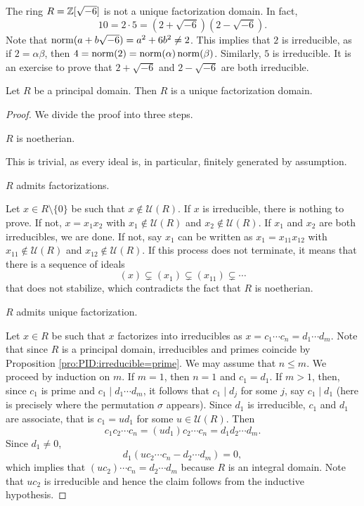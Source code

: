 \begin{example}
	The ring $R=\mathbb{Z}[\sqrt{-6}]$ is not a unique factorization domain. In fact,
	\[
	10=2\cdot 5=(2+\sqrt{-6})(2-\sqrt{-6}).
	\]	
	Note that $\operatorname{norm}(a+b\sqrt{-6})=a^2+6b^2\ne 2$. This implies that $2$ is irreducible, as 
	if $2=\alpha\beta$, then $4=\operatorname{norm}(2)=\operatorname{norm}(\alpha)\operatorname{norm}(\beta)$. 
	Similarly, $5$ is irreducible. It is an exercise to prove that 
	$2+\sqrt{-6}$ and $2-\sqrt{-6}$ are both irreducible. 
\end{example}

\begin{theorem}
\label{thm:PID=>UFD}
	Let $R$ be a principal domain. 
	Then $R$ is a unique factorization domain.
\end{theorem}

\begin{proof}
	We divide the proof into three steps. 
	\begin{claim}
		$R$ is noetherian. 	
	\end{claim}
	
	This is trivial, as every ideal is, in particular, finitely generated by assumption.   

	\begin{claim}
		$R$ admits factorizations. 	
	\end{claim}
	
	Let $x\in R\setminus\{0\}$ be such that $x\not\in\mathcal{U}(R)$. If $x$ is irreducible, 
	there is nothing to prove. If not, $x=x_1x_2$ with $x_1\not\in\mathcal{U}(R)$ and
	$x_2\not\in\mathcal{U}(R)$. If $x_1$ and $x_2$ are both irreducibles, 
	we are done. If not, say $x_1$ can be written as $x_1=x_{11}x_{12}$ with
	$x_{11}\not\in\mathcal{U}(R)$ and $x_{12}\not\in\mathcal{U}(R)$. If this process
	does not terminate, it means that there is a sequence of ideals
	\[
	(x)\subsetneq (x_1)\subsetneq (x_{11})\subsetneq\cdots 
	\]
	that does not stabilize, which contradicts the fact that $R$ is noetherian.  
	
	\begin{claim}
		$R$ admits unique factorization.	
	\end{claim}
	
	Let $x\in R$ be such that $x$ factorizes into irreducibles as 
	$x=c_1\cdots c_n=d_1\cdots d_m$. 
	Note that since $R$ is a principal domain, irreducibles and primes coincide by 
	Proposition \ref{pro:PID:irreducible=prime}. 
	We may assume that $n\leq m$. We proceed by 
	induction on $m$. If $m=1$, then 
	$n=1$ and $c_1=d_1$. If $m>1$, then, since $c_1$ is prime and 
	$c_1\mid d_1\cdots d_m$, it follows that $c_1\mid d_j$ for some $j$, 
	say $c_1\mid d_1$ (here is precisely where the permutation $\sigma$ appears). Since
	$d_1$ is irreducible, $c_1$ and $d_1$ are associate, that is
	$c_1=ud_1$ for some $u\in\mathcal{U}(R)$. Then
	\[
	c_1c_2\cdots c_n=(ud_1)c_2\cdots c_n=d_1d_2\cdots d_m. 
	\]
	Since $d_1\ne 0$,  
	\[
	d_1(uc_2\cdots c_n-d_2\cdots d_m)=0,
	\]
	which implies that $(uc_2)\cdots c_n=d_2\cdots d_m$ because $R$ is an integral domain. Note
	that $uc_2$ is irreducible and hence 
	the claim follows from the inductive hypothesis. 
\end{proof}

